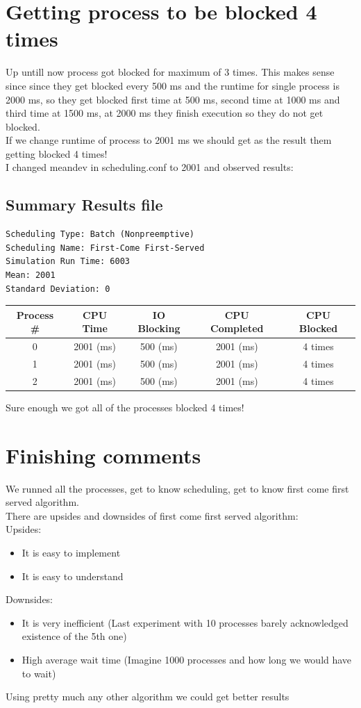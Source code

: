 \documentclass{article}
\begin{document}
\section{Getting process to be blocked 4 times}
Up untill now process got blocked for maximum of 3 times. This makes sense since
since they get blocked every 500 ms and the runtime for single process is 2000
ms, so they get blocked first time at 500 ms, second time at 1000 ms and third
time at 1500 ms, at 2000 ms they finish execution so they do not get blocked. \\
If we change runtime of process to 2001 ms we should get as the result them
getting blocked 4 times! \\
I changed meandev in scheduling.conf to 2001 and observed results:
\subsection{Summary Results file}
\begin{lstlisting}
Scheduling Type: Batch (Nonpreemptive)
Scheduling Name: First-Come First-Served
Simulation Run Time: 6003
Mean: 2001
Standard Deviation: 0
\end{lstlisting}
\begin{center}
	\begin{tabular}{| c | c | c | c | c |}
		\hline
		Process \#&	CPU Time&	IO Blocking&	CPU Completed&
		CPU Blocked \\ \hline
		0	&	2001 (ms)&	500 (ms)&	2001 (ms)&
		4 times  \\ \hline
		1	&	2001 (ms)&	500 (ms)&	2001 (ms)&
		4 times \\ \hline
		2	&	2001 (ms)&	500 (ms)&	2001 (ms)&
		4 times \\ \hline
\end{tabular}
\end{center}
Sure enough we got all of the processes blocked 4 times!
\section{Finishing comments}
We runned all the processes, get to know scheduling, get to know first come
first served algorithm. \\
There are upsides and downsides of first come first served algorithm:
\\
Upsides:
\begin{itemize}
	\item It is easy to implement
	\item It is easy to understand
\end{itemize}
Downsides:
\begin{itemize}
	\item It is very inefficient (Last experiment with 10 processes barely
		acknowledged existence of the 5th one)
	\item High average wait time (Imagine 1000 processes and how long we
		would have to wait)
\end{itemize}
Using pretty much any other algorithm we could get better results \cite{First
come first serve}
\end{document}
